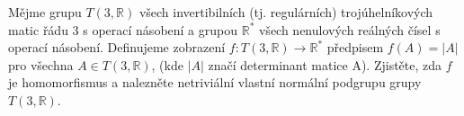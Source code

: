 Mějme grupu $T(3, \mathbb{R})$ všech invertibilních (tj. regulárních)
trojúhelníkových matic řádu 3 s operací násobení a grupou $\mathbb{R}^{*}$ všech
nenulových reálných čísel s operací násobení. Definujeme zobrazení $f:T(3,
\mathbb{R}) \rightarrow \mathbb{R}^{*}$ předpisem $f(A)=\left |  A\right |$ pro
všechna $A \in T(3, \mathbb{R})$, (kde $\left |  A\right |$ značí determinant
matice A). Zjistěte, zda $f$ je homomorfismus a nalezněte netriviální vlastní
normální podgrupu grupy $T(3, \mathbb{R})$.
